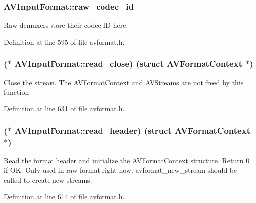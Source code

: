 \subsubsection[{\texorpdfstring{raw\+\_\+codec\+\_\+id}{raw_codec_id}}]{ A\+V\+Input\+Format\+::raw\+\_\+codec\+\_\+id}\hypertarget{struct_a_v_input_format_ac12c67e8e0b7bc2b0c26ab383d9a0c76}{}\label{struct_a_v_input_format_ac12c67e8e0b7bc2b0c26ab383d9a0c76}
Raw demuxers store their codec ID here. 

Definition at line 595 of file avformat.\+h.

\subsubsection[{\texorpdfstring{read\+\_\+close}{read_close}}]{($\ast$ A\+V\+Input\+Format\+::read\+\_\+close) (struct {\bf A\+V\+Format\+Context} $\ast$)}\hypertarget{struct_a_v_input_format_a725b4fbd5a28109d255d272f46efac90}{}\label{struct_a_v_input_format_a725b4fbd5a28109d255d272f46efac90}
Close the stream. The \hyperlink{struct_a_v_format_context}{A\+V\+Format\+Context} and A\+V\+Streams are not freed by this function 

Definition at line 631 of file avformat.\+h.

\subsubsection[{\texorpdfstring{read\+\_\+header}{read_header}}]{($\ast$ A\+V\+Input\+Format\+::read\+\_\+header) (struct {\bf A\+V\+Format\+Context} $\ast$)}\hypertarget{struct_a_v_input_format_a286d65d159570516e5ed38fcbb842d5a}{}\label{struct_a_v_input_format_a286d65d159570516e5ed38fcbb842d5a}
Read the format header and initialize the \hyperlink{struct_a_v_format_context}{A\+V\+Format\+Context} structure. Return 0 if OK. Only used in raw format right now. \textquotesingle{}avformat\+\_\+new\+\_\+stream\textquotesingle{} should be called to create new streams. 

Definition at line 614 of file avformat.\+h.

